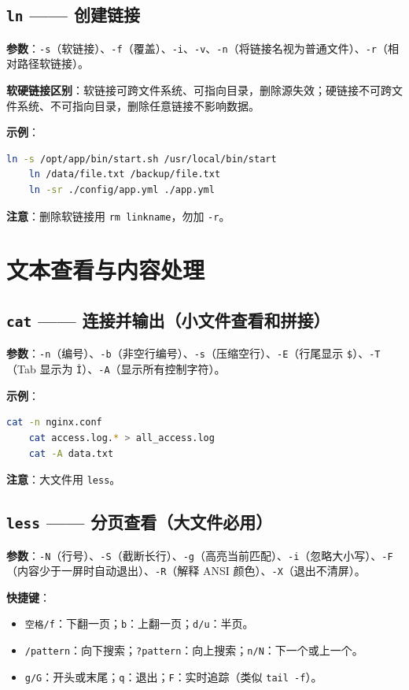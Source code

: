 \subsection{\texttt{ln} —— 创建链接} \textbf{参数}：\texttt{-s}（软链接）、\texttt{-f}（覆盖）、\texttt{-i}、\texttt{-v}、\texttt{-n}（将链接名视为普通文件）、\texttt{-r}（相对路径软链接）。

\textbf{软硬链接区别}：软链接可跨文件系统、可指向目录，删除源失效；硬链接不可跨文件系统、不可指向目录，删除任意链接不影响数据。

\textbf{示例}：
\begin{lstlisting}[language=bash]
	ln -s /opt/app/bin/start.sh /usr/local/bin/start
	ln /data/file.txt /backup/file.txt
	ln -sr ./config/app.yml ./app.yml
\end{lstlisting}

\textbf{注意}：删除软链接用 \texttt{rm linkname}，勿加 \texttt{-r}。

\section{文本查看与内容处理}

\subsection{\texttt{cat} —— 连接并输出（小文件查看和拼接）} \textbf{参数}：\texttt{-n}（编号）、\texttt{-b}（非空行编号）、\texttt{-s}（压缩空行）、\texttt{-E}（行尾显示 \texttt{\$}）、\texttt{-T}（Tab 显示为 \texttt{\^I}）、\texttt{-A}（显示所有控制字符）。

\textbf{示例}：
\begin{lstlisting}[language=bash]
	cat -n nginx.conf
	cat access.log.* > all_access.log
	cat -A data.txt
\end{lstlisting}

\textbf{注意}：大文件用 \texttt{less}。

\subsection{\texttt{less} —— 分页查看（大文件必用）} \textbf{参数}：\texttt{-N}（行号）、\texttt{-S}（截断长行）、\texttt{-g}（高亮当前匹配）、\texttt{-i}（忽略大小写）、\texttt{-F}（内容少于一屏时自动退出）、\texttt{-R}（解释 ANSI 颜色）、\texttt{-X}（退出不清屏）。

\textbf{快捷键}：
\begin{itemize}
\item \texttt{空格/f}：下翻一页；\texttt{b}：上翻一页；\texttt{d/u}：半页。
\item \texttt{/pattern}：向下搜索；\texttt{?pattern}：向上搜索；\texttt{n/N}：下一个或上一个。
\item \texttt{g/G}：开头或末尾；\texttt{q}：退出；\texttt{F}：实时追踪（类似 \texttt{tail -f}）。
\end{itemize}

